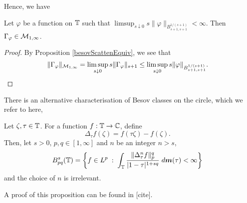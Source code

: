 Hence, we have
\begin{proposition}
\label{macaevHankel}
    Let $\varphi$ be a function on $\mathbb{T}$ such that $\limsup_{s \downarrow 0} s\|\varphi\|_{B_{s+1,s+1}^{1/(s+1)}} < \infty$.
    Then $\Gamma_\varphi \in \mathcal{M}_{1,\infty}$.
\end{proposition}
\begin{proof}
    By Proposition \ref{besovScattenEquiv}, we see that
    \begin{equation}
        \|\Gamma_\varphi\|_{\mathcal{M}_{1,\infty}} = \limsup_{s\downarrow 0} s\|\Gamma_\varphi\|_{s+1} \leq \limsup_{s \downarrow 0} s\|\varphi\|_{B_{s+1,s+1}^{1/(s+1)}}.
    \end{equation}
\end{proof}


There is an alternative characterisation of Besov
classes on the circle, which we refer to here,
\begin{proposition}
\label{altBesov}
    Let $\zeta,\tau \in \mathbb{T}$. For a function
    $f:\mathbb{T}\to\mathbb{C}$, define
    \begin{equation}
        \Delta_\tau f(\zeta) = f(\tau\zeta)-f(\zeta).
    \end{equation}
    Then, let $s > 0$, $p,q \in [1,\infty]$ and $n$ be an integer $n > s$,
    \begin{equation}
        B_{pq}^s(\mathbb{T}) = \left\{f \in L^p\;:\;\int_{\mathbb{T}} \frac{\|\Delta^n_\tau f\|_p^q}{|1-\tau|^{1+sq}}\;d\boldsymbol{m}(\tau) < \infty\right\}
    \end{equation}
    and the choice of $n$ is irrelevant.
\end{proposition}
A proof of this proposition can be found in [cite].




